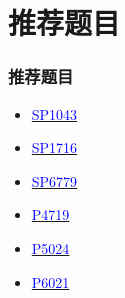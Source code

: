 \documentclass[UTF8]{ctexbeamer}
\begin{document}
\section{推荐题目}
	\begin{frame}
		\frametitle{推荐题目}
			\begin{itemize} 
				\item \href{https://www.luogu.com.cn/problem/SP1043}{\textcolor{blue}{SP1043}}
				\item
				\href{https://www.luogu.com.cn/problem/SP1716}{\textcolor{blue}{SP1716}}
				\item \href{https://www.luogu.com.cn/problem/SP6779}{\textcolor{blue}{SP6779}}
				\item \href{https://www.luogu.com.cn/problem/P4719}{\textcolor{blue}{P4719}}
				\item \href{https://www.luogu.com.cn/problem/P5024}{\textcolor{blue}{P5024}}
				\item \href{https://www.luogu.com.cn/problem/P6021}{\textcolor{blue}{P6021}}
			\end{itemize}
	\end{frame}
\end{document}
